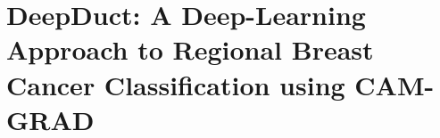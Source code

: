\chapter{DeepDuct: A Deep-Learning Approach to Regional Breast Cancer Classification using CAM-GRAD}



